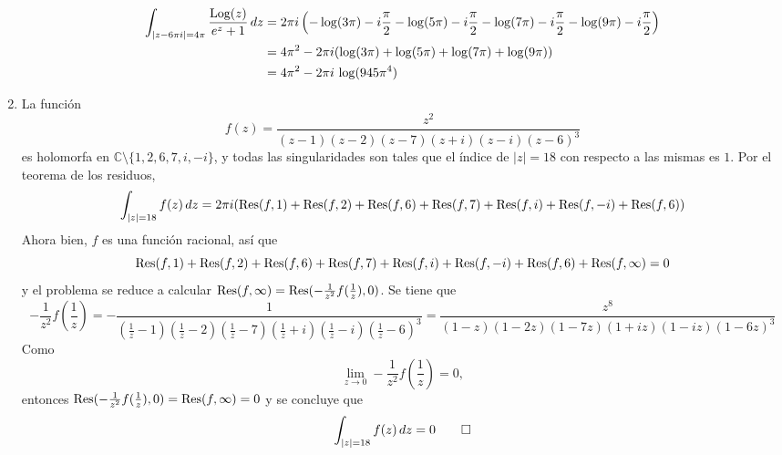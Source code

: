 \documentclass[11pt]{report}
\makeatletter
\renewenvironment{proof}[1][\proofname]{\par
  \pushQED{\qed}%
  \normalfont \topsep\z@skip %
  \trivlist
  \item[\hskip\labelsep
        \itshape
    #1\@addpunct{.}]\ignorespaces
}{%
  \popQED\endtrivlist\@endpefalse
}
\newcommand{\C}{\mathbb C}
\makeatother
\begin{document}
\begin{proof}
\begin{enumerate}
\[\begin{aligned}[t]
    \int_{|z-6\pi i| = 4\pi} \frac{\textup{Log}(z)}{e^z+1} \, dz &= 2\pi i\left(-\log(3\pi )-i\frac{\pi}{2} -\log(5\pi )-i\frac{\pi}{2} -\log(7\pi )-i\frac{\pi}{2}-\log(9\pi)-i\frac{\pi}{2}\right) 
    \\
    &=4\pi^2-2\pi i(\log(3\pi )+\log(5\pi )+\log(7\pi )+\log(9\pi))  \\
    &= 4\pi^2-2\pi i \, \log(945\pi^4)
    \end{aligned}
    \] 
    \item La función
    \[f(z)=\frac{z^2}{(z-1)(z-2)(z-7)(z+i)(z-i)(z-6)^3}\]
    es holomorfa en $\C\setminus \{1,2,6,7,i,-i\}$, y todas las singularidades son tales que el índice de $|z|=18$ con respecto a las mismas es $1$. Por el teorema de los residuos,
    \[\int_{|z|=18} f(z)\, dz = 2\pi i(\textup{Res}(f,1) + \textup{Res}(f,2) + \textup{Res}(f,6) + \textup{Res}(f,7) + \textup{Res}(f,i) + \textup{Res}(f,-i) + \textup{Res}(f,6))\]
    Ahora bien, $f$ es una función racional, así que
    \[\textup{Res}(f,1) + \textup{Res}(f,2) + \textup{Res}(f,6) + \textup{Res}(f,7) + \textup{Res}(f,i) + \textup{Res}(f,-i) + \textup{Res}(f,6)+\textup{Res}(f,\infty) = 0\]
    y el problema se reduce a calcular $\textup{Res}(f,\infty) = \textup{Res}(-\frac{1}{z^2}f(\frac{1}{z}),0)$. Se tiene que
    \[-\frac{1}{z^2}f\left(\frac{1}{z}\right) = -\frac{1}{(\frac{1}{z}-1)(\frac{1}{z}-2)(\frac{1}{z}-7)(\frac{1}{z}+i)(\frac{1}{z}-i)(\frac{1}{z}-6)^3} = \frac{z^8}{(1-z)(1-2z)(1-7z)(1+iz)(1-iz)(1-6z)^3}\]
    Como 
    \[\lim_{z \to 0}-\frac{1}{z^2}f\left(\frac{1}{z}\right) = 0,\]
    entonces $\textup{Res}(-\frac{1}{z^2}f(\frac{1}{z}),0) = \textup{Res}(f,\infty) = 0$ y se concluye que
    \[\int_{|z|=18} f(z)\, dz=0 \qedhere\]
  \end{enumerate}
\end{proof}
\end{document}
